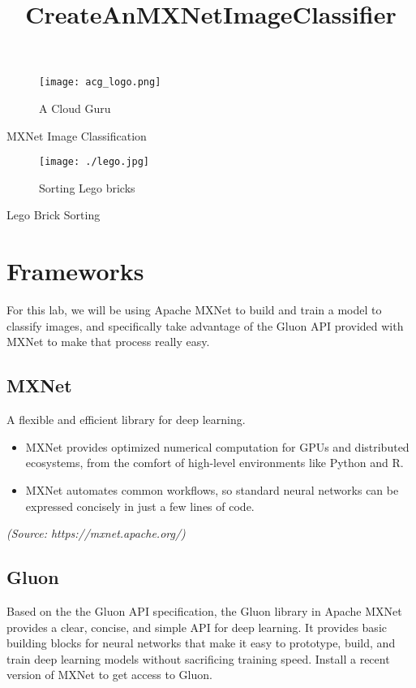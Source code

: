 \documentclass[11pt]{article}
\title{CreateAnMXNetImageClassifier}
\providecommand{\tightlist}{%
      \setlength{\itemsep}{0pt}\setlength{\parskip}{0pt}}
\begin{document}
    
    \maketitle
    
    

    
    \begin{figure}
\centering
\texttt{[image: acg\_logo.png]}
\caption{A Cloud Guru}
\end{figure}

    MXNet Image Classification

    \begin{figure}
\centering
\texttt{[image: ./lego.jpg]}
\caption{Sorting Lego bricks}
\end{figure}

    Lego Brick Sorting

    \section{Frameworks}\label{frameworks}

For this lab, we will be using Apache MXNet to build and train a model
to classify images, and specifically take advantage of the Gluon API
provided with MXNet to make that process really easy.

\subsection{MXNet}\label{mxnet}

A flexible and efficient library for deep learning.

\begin{itemize}
\tightlist
\item
  MXNet provides optimized numerical computation for GPUs and
  distributed ecosystems, from the comfort of high-level environments
  like Python and R.
\item
  MXNet automates common workflows, so standard neural networks can be
  expressed concisely in just a few lines of code.
\end{itemize}

\emph{(Source: https://mxnet.apache.org/)}

\subsection{Gluon}\label{gluon}

Based on the the Gluon API specification, the Gluon library in Apache
MXNet provides a clear, concise, and simple API for deep learning. It
provides basic building blocks for neural networks that make it easy to
prototype, build, and train deep learning models without sacrificing
training speed. Install a recent version of MXNet to get access to
Gluon.
\end{document}
